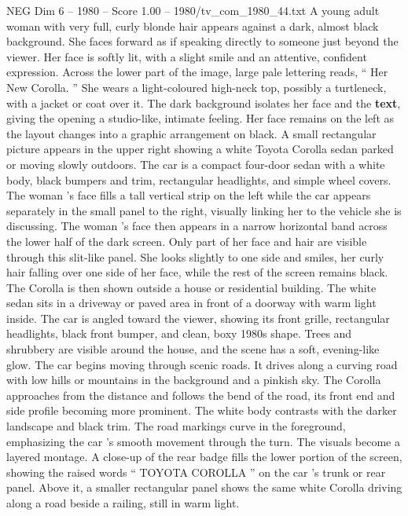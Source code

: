 \begin{textsample}{NEG Dim 6 – 1980 – Score 1.00 – 1980/tv\_com\_1980\_44.txt}  \label{ex:f6_neg_069}
A young adult woman with very full, curly blonde hair appears against a dark, almost black background.
She faces forward as if speaking directly to someone just beyond the viewer.
Her face is softly lit, with a slight smile and an attentive, confident expression.
Across the lower part of the image, large pale lettering reads, “ Her New Corolla. ” She wears a light-coloured high-neck top, possibly a turtleneck, with a jacket or coat over it.
The dark background isolates her face and the \textbf{text}, giving the opening a studio-like, intimate feeling.
Her face remains on the left as the layout changes into a graphic arrangement on black.
A small rectangular picture appears in the upper right showing a white Toyota Corolla sedan parked or moving slowly outdoors.
The car is a compact four-door sedan with a white body, black bumpers and trim, rectangular headlights, and simple wheel covers.
The woman ’s face fills a tall vertical strip on the left while the car appears separately in the small panel to the right, visually linking her to the vehicle she is discussing.
The woman ’s face then appears in a narrow horizontal band across the lower half of the dark screen.
Only part of her face and hair are visible through this slit-like panel.
She looks slightly to one side and smiles, her curly hair falling over one side of her face, while the rest of the screen remains black.
The Corolla is then shown outside a house or residential building.
The white sedan sits in a driveway or paved area in front of a doorway with warm light inside.
The car is angled toward the viewer, showing its front grille, rectangular headlights, black front bumper, and clean, boxy 1980s shape.
Trees and shrubbery are visible around the house, and the scene has a soft, evening-like glow.
The car begins moving through scenic roads.
It drives along a curving road with low hills or mountains in the background and a pinkish sky.
The Corolla approaches from the distance and follows the bend of the road, its front end and side profile becoming more prominent.
The white body contrasts with the darker landscape and black trim.
The road markings curve in the foreground, emphasizing the car ’s smooth movement through the turn.
The visuals become a layered montage.
A close-up of the rear badge fills the lower portion of the screen, showing the raised words “ TOYOTA COROLLA ” on the car ’s trunk or rear panel.
Above it, a smaller rectangular panel shows the same white Corolla driving along a road beside a railing, still in warm light.

\end{textsample}
